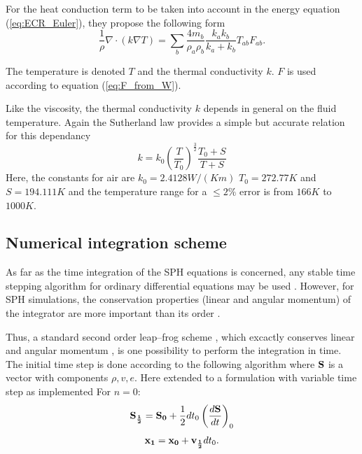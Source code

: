 \documentclass{report}
\begin{document}
For the heat conduction term to be taken into account in the energy equation (\ref{eq:ECR_Euler}), they propose the following form
\begin{equation}
 \label{eq:heatConductionTerm}
\frac{1}{\rho}\nabla \cdot (k \nabla T)=\sum_b\frac{4 m_b}{\rho_a \rho_b} \frac{k_a k_b}{k_a + k_b} T_{ab} F_{ab}.
\end{equation}

The temperature is denoted $T$ and the thermal conductivity $k$. $F$ is used according to equation (\ref{eq:F_from_W}). 

Like the viscosity, the thermal conductivity $k$ depends in general on the fluid temperature. Again the Sutherland law provides a simple but accurate relation for this dependancy \cite{White1974}
\begin{equation}
k=k_0 \left(\frac{T}{T_0}\right)^{\frac{3}{2}}\frac{T_0+S}{T+S}
\end{equation}
Here, the constants for air are $k_0=2.4128W/(K m)$ $T_0=272.77K$ and $S=194.111K$ and the temperature range for a  $\leq2\%$ error is from $166K$ to $1000K$. 



\subsection{Numerical integration scheme}
\label{sec:numIntegr}

As far as the time integration of the SPH equations is concerned, any stable
time stepping algorithm for ordinary differential equations may be
used \cite{Monaghan2005}. However, for SPH simulations, the conservation properties
(linear and angular momentum) of the integrator are more important than its
order \cite{Monaghan2005}.

Thus, a standard second order leap--frog scheme %
, which excactly conserves linear and angular momentum
, is one possibility to perform the integration in
time. The initial time step is done according to the following algorithm where
${\bf S}$ is a vector with components  $\rho,v,e$.
Here extended to a formulation with variable time step as implemented
\linebreak[2]
For $n=0$:
\begin{equation}
{\bf S_{\frac{1}{2}}}={\bf S_0}+\frac{1}{2}dt_0\left(\frac{d{\bf S}}{dt}\right)_0
\end{equation}
\begin{equation}
{\bf x_1}={\bf x_0}+{\bf v_{\frac{1}{2}}}dt_0 .
\end{equation}
\end{document}
